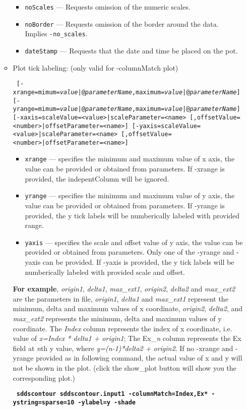 \begin{itemize}
\begin{itemize}
\begin{itemize}
        \item \verb|noScales| --- Requests omission of the numeric scales.
        \item \verb|noBorder| --- Requests omission of the border around the data.  Implies \verb|-no_scales|.
        \item \verb|dateStamp| --- Requests that the date and time be placed on the pot.
        \end{itemize}
    \item Plot tick labeling: (only valid for -columnMatch plot)
\begin{flushleft}{\tt
[-xrange=mimum={\em value}|@{\em parameterName},maximum={\em value}|@{\em parameterName}] 
[-yrange=mimum={\em value}|@{\em parameterName},maximum={\em value}|@{\em parameterName}]
[-xaxis=scaleValue=<value>|scaleParameter=<name>
   [,offsetValue=<number>|offsetParameter=<name>] 
[-yaxis=scaleValue=<value>|scaleParameter=<name>
   [,offsetValue=<number>|offsetParameter=<name>]
}\end{flushleft}
        \begin{itemize} 
        \item \verb|xrange| --- specifies the minimum and maximum value of x axis, the value can be provided or obtained from parameters. If -xrange is provided, the indepentColumn will be ignored.
        \item \verb|yrange| --- specifies the minimum and maximum value of y axis, the value can be provided or obtained from parameters. If -yrange is provided, the y tick labels will be numberically labeled with provided range.
        \item \verb|yaxis| --- specifies the scale and offset value of y axis, the value can be provided or obtained from parameters. Only one of the -yrange and -yaxis can be provided. If -yaxis is provided, the y tick labels will be numberically labeled with provided scale and offset.
        \end{itemize}
        {\bf For example}, {\em origin1}, {\em delta1}, {\em max\_ext1}, {\em origin2}, {\em delta2} and {\em max\_ext2} are the parameters in  file, {\em origin1}, {\em delta1} and {\em max\_ext1} represent the minimum, delta and maximum values of x coordinate, {\em origin2}, {\em delta2}, and {\em max\_ext2} represents the minimum, delta and maximum values of y coordinate. The {\em Index} column represents the index of x coordinate, i.e. value of {\em x=Index * delta1 + origin1}; The Ex\_{\em n} column represents the Ex field at {\em n}th y value, where {\em y=(n-1)*delta2 + origin2}. If no -xrange and -yrange provided as in following command, the actual value of x and y will not be shown in the plot. (click the show\_plot button will show you the corresponding plot.) 
       \begin{flushleft}{\tt \bf
            sddscontour sddscontour.input1 -columnMatch=Index,Ex* -ystring=sparse=10 -ylabel=y -shade
        }\end{flushleft}


\end{itemize}
\end{itemize}
